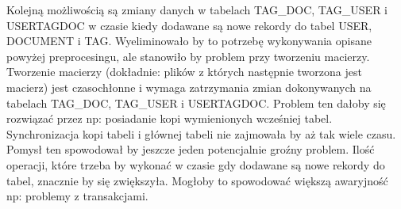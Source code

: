 Kolejną możliwością są zmiany danych w tabelach TAG\_DOC, TAG\_USER i USERTAGDOC w czasie kiedy dodawane są nowe rekordy do tabel USER, DOCUMENT i TAG. Wyeliminowało by to potrzebę wykonywania opisane powyżej preprocesingu, ale stanowiło by problem przy tworzeniu macierzy. Tworzenie macierzy (dokładnie: plików z których następnie tworzona jest macierz) jest czasochłonne i wymaga zatrzymania zmian dokonywanych na tabelach TAG\_DOC, TAG\_USER i USERTAGDOC. Problem ten dałoby się rozwiązać przez np: posiadanie kopi wymienionych wcześniej tabel. Synchronizacja kopi tabeli i głównej tabeli nie zajmowała by aż tak wiele czasu. Pomysł ten spowodował by jeszcze jeden potencjalnie groźny problem. Ilość operacji, które trzeba by wykonać w czasie gdy dodawane są nowe rekordy do tabel, znacznie by się zwiększyła. Mogłoby to spowodować większą awaryjność np: problemy z transakcjami.












